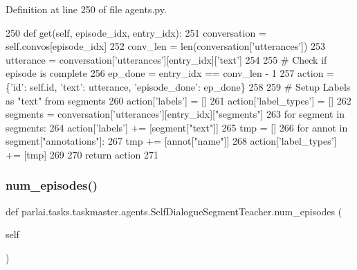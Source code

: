 Definition at line 250 of file agents.\+py.


\begin{DoxyCode}
250     \textcolor{keyword}{def }get(self, episode\_idx, entry\_idx):
251         conversation = self.convos[episode\_idx]
252         conv\_len = len(conversation[\textcolor{stringliteral}{'utterances'}])
253         utterance = conversation[\textcolor{stringliteral}{'utterances'}][entry\_idx][\textcolor{stringliteral}{'text'}]
254 
255         \textcolor{comment}{# Check if episode is complete}
256         ep\_done = entry\_idx == conv\_len - 1
257         action = \{\textcolor{stringliteral}{'id'}: self.id, \textcolor{stringliteral}{'text'}: utterance, \textcolor{stringliteral}{'episode\_done'}: ep\_done\}
258 
259         \textcolor{comment}{# Setup Labels as "text" from segments}
260         action[\textcolor{stringliteral}{'labels'}] = []
261         action[\textcolor{stringliteral}{'label\_types'}] = []
262         segments = conversation[\textcolor{stringliteral}{'utterances'}][entry\_idx][\textcolor{stringliteral}{"segments"}]
263         \textcolor{keywordflow}{for} segment \textcolor{keywordflow}{in} segments:
264             action[\textcolor{stringliteral}{'labels'}] += [segment[\textcolor{stringliteral}{"text"}]]
265             tmp = []
266             \textcolor{keywordflow}{for} annot \textcolor{keywordflow}{in} segment[\textcolor{stringliteral}{"annotations"}]:
267                 tmp += [annot[\textcolor{stringliteral}{"name"}]]
268             action[\textcolor{stringliteral}{'label\_types'}] += [tmp]
269 
270         \textcolor{keywordflow}{return} action
271 
\end{DoxyCode}
\mbox{\label{classparlai_1_1tasks_1_1taskmaster_1_1agents_1_1SelfDialogueSegmentTeacher_ac6074b82541ad78c9a4306877aff0764}} 
\subsubsection{\texorpdfstring{num\+\_\+episodes()}{num\_episodes()}}
{\footnotesize\ttfamily def parlai.\+tasks.\+taskmaster.\+agents.\+Self\+Dialogue\+Segment\+Teacher.\+num\+\_\+episodes (\begin{DoxyParamCaption}\item[{}]{self }\end{DoxyParamCaption})}



